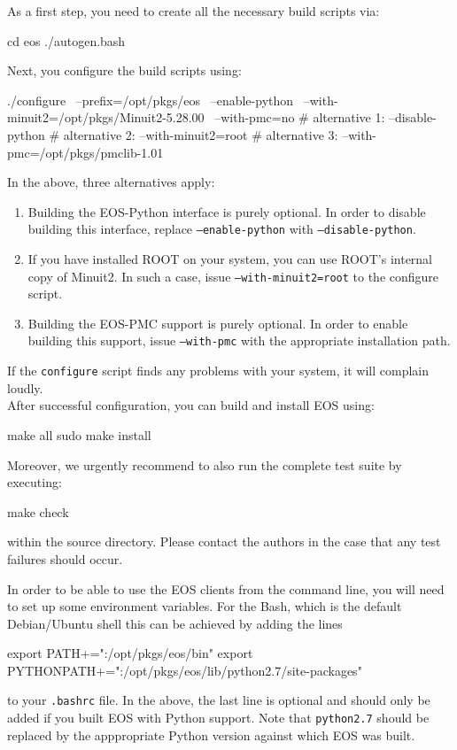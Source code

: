 As a first step, you need to create all the necessary build scripts via:
%
\begin{commandline}
cd eos
./autogen.bash
\end{commandline}
%
Next, you configure the build scripts using:
%
\begin{commandline}
./configure \
    --prefix=/opt/pkgs/eos \
    --enable-python \
    --with-minuit2=/opt/pkgs/Minuit2-5.28.00 \
    --with-pmc=no
    # alternative 1: --disable-python
    # alternative 2: --with-minuit2=root
    # alternative 3: --with-pmc=/opt/pkgs/pmclib-1.01
\end{commandline}
%
In the above, three alternatives apply:
\begin{enumerate}
    \item Building the EOS-Python interface is purely optional. In order to disable building
    this interface, replace \texttt{--enable-python} with \texttt{--disable-python}.
    \item If you have installed ROOT on your system, you can use ROOT's internal copy of Minuit2.
    In such a case, issue \texttt{--with-minuit2=root} to the configure script.
    \item Building the EOS-PMC support is purely optional. In order to enable building this
    support, issue \texttt{--with-pmc} with the appropriate installation path.
\end{enumerate}
If the \texttt{configure} script finds any problems with your system, it will complain loudly.\\

After successful configuration, you can build and install EOS using:
%
\begin{commandline}
make all
sudo make install
\end{commandline}
%
Moreover, we urgently recommend to also run the complete test suite by executing:
%
\begin{commandline}
make check
\end{commandline}
%
within the source directory. Please contact the authors in the case that any
test failures should occur.


In order to be able to use the EOS clients from the command line, you will need to
set up some environment variables. For the Bash, which is the default Debian/Ubuntu
shell this can be achieved by adding the lines
\begin{commandline}
export PATH+=":/opt/pkgs/eos/bin"
export PYTHONPATH+=":/opt/pkgs/eos/lib/python2.7/site-packages"
\end{commandline}
to your \texttt{.bashrc} file. In the above, the last line is optional and should only be
added if you built EOS with Python support. Note that \texttt{python2.7} should be
replaced by the apppropriate Python version against which EOS was built.


